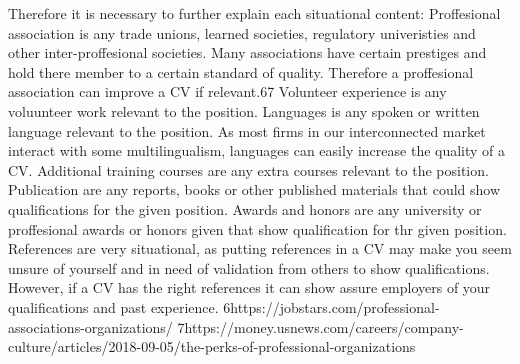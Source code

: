 Therefore it is necessary to further explain each situational content:
Proffesional association is any trade unions, learned societies, regulatory univeristies and other inter-proffesional societies. 
Many associations have certain prestiges and hold there member to a certain standard of quality. 
Therefore a proffesional association can improve a CV if relevant.67
Volunteer experience is any voluunteer work relevant to the position.
Languages is any spoken or written language relevant to the position. 
As most firms in our interconnected market interact with some multilingualism, languages can easily increase the quality of a CV.
Additional training courses are any extra courses relevant to the position.
Publication are any reports, books or other published materials that could show qualifications for the given position.
Awards and honors are any university or proffesional awards or honors given that show qualification for thr given position.
References are very situational, as putting references in a CV may make you seem unsure of yourself and in need of validation from others to show qualifications.
However, if a CV has the right references it can show assure employers of your qualifications and past experience.
6https://jobstars.com/professional-associations-organizations/
7https://money.usnews.com/careers/company-culture/articles/2018-09-05/the-perks-of-professional-organizations